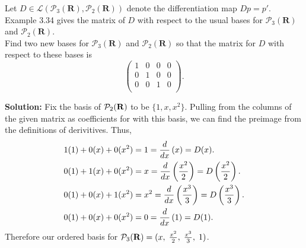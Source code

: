 Let $D \in \mathcal{L}(\mathcal{P}_3(\mathbf{R}), \mathcal{P}_2(\mathbf{R}))$ denote the differentiation map $Dp = p'$.  Example 3.34 gives the matrix of $D$ with respect to the usual bases for $\mathcal{P}_3(\mathbf{R})$ and $\mathcal{P}_2(\mathbf{R})$.  \\
        Find two new bases for $\mathcal{P}_3(\mathbf{R})$ and $\mathcal{P}_2(\mathbf{R})$ so that the matrix for $D$ with respect to these bases is
        \[
        \left(
          \begin{array}{cccc}
            1 & 0 & 0 & 0 \\
            0 & 1 & 0 & 0 \\
            0 & 0 & 1 & 0 \\
          \end{array}
        \right).
        \]\vspace{.4in}
        \begin{mybox}
            \textbf{Solution: } Fix the basis of $\mathcal{P}_{2}(\mathbf{R})$ to be $\{1, x, x^2\}$. Pulling from the columns of the given matrix as coefficients for with this basis, we can find the preimage from the definitions of derivitives. Thus,
            \begin{align}
                1(1) + 0(x) + 0(x^2) &= 1 = \frac{d}{dx} \left( {x} \right) = D(x). \notag\\
                0(1) + 1(x) + 0(x^2) &= x = \frac{d}{dx} \left( {\frac{x^2}{2}} \right) = D\left( {\frac{x^2}{2}} \right) .\notag\\
                0(1) + 0(x) + 1(x^2) &= x^2 = \frac{d}{dx} \left( {\frac{x^3}{3}} \right) = D\left( {\frac{x^3}{3}} \right).\notag\\
                0(1) + 0(x) + 0(x^2) &= 0 = \frac{d}{dx} \left( {1} \right) = D(1).\notag 
            \end{align} 
            Therefore our ordered basis for $\mathcal{P}_{3}(\mathbf{R}) = (x,\;\frac{x^2}{2},\;\frac{x^3}{3},\;1)$.
        \end{mybox}